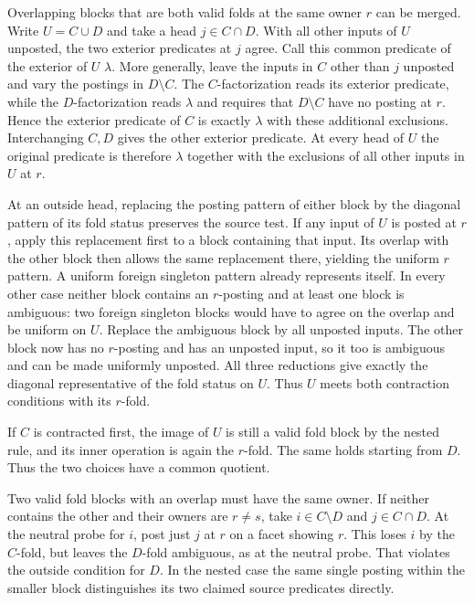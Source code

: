 Overlapping blocks that are both valid folds at the
same owner $r$ can be merged. Write $U=C\cup D$ and
take a head $j\in C\cap D$. With all other inputs
of $U$ unposted, the two exterior predicates at
$j$ agree. Call this common predicate of the
exterior of $U$ $\lambda$. More generally, leave
the inputs in $C$ other than $j$ unposted and vary
the postings in $D\setminus C$. The $C$-factorization
reads its exterior predicate, while the $D$-factorization
reads $\lambda$ and requires that $D\setminus C$ have
no posting at $r$. Hence the exterior predicate of
$C$ is exactly $\lambda$ with these additional
exclusions. Interchanging $C,D$ gives the other
exterior predicate. At every head of $U$ the original
predicate is therefore $\lambda$ together with the
exclusions of all other inputs in $U$ at $r$.

At an outside head, replacing the posting pattern
of either block by the diagonal pattern of its fold
status preserves the source test. If any input of
$U$ is posted at $r$, apply this replacement first
to a block containing that input. Its overlap with
the other block then allows the same replacement
there, yielding the uniform $r$ pattern. A uniform
foreign singleton pattern already represents itself.
In every other case neither block contains an
$r$-posting and at least one block is ambiguous:
two foreign singleton blocks would have to agree on
the overlap and be uniform on $U$. Replace the
ambiguous block by all unposted inputs. The other
block now has no $r$-posting and has an unposted
input, so it too is ambiguous and can be made
uniformly unposted. All three reductions give
exactly the diagonal representative of the fold
status on $U$. Thus $U$ meets both contraction
conditions with its $r$-fold.

If $C$ is contracted first, the image of $U$ is
still a valid fold block by the nested rule, and its
inner operation is again the $r$-fold. The same
holds starting from $D$. Thus the two choices
have a common quotient.

Two valid fold blocks with an overlap must have the
same owner. If neither contains the other and their
owners are $r\ne s$, take $i\in C\setminus D$ and
$j\in C\cap D$. At the neutral probe for $i$, post
just $j$ at $r$ on a facet showing $r$. This loses
$i$ by the $C$-fold, but leaves the $D$-fold ambiguous,
as at the neutral probe. That violates the outside
condition for $D$. In the nested case the same
single posting within the smaller block distinguishes
its two claimed source predicates directly.

